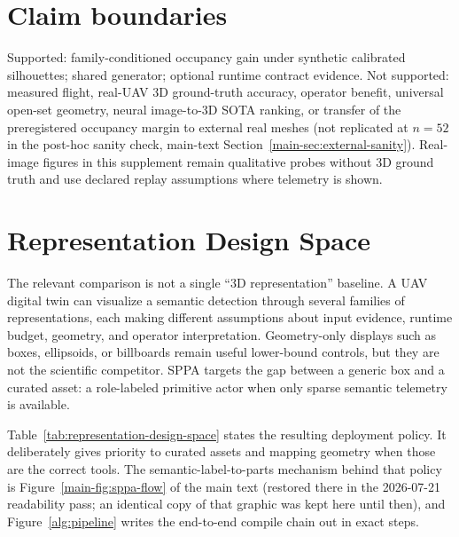 \documentclass[10pt]{article}
\begin{document}
\section*{Claim boundaries}

Supported: family-conditioned occupancy gain under synthetic calibrated
silhouettes; shared generator; optional runtime contract evidence.
Not supported: measured flight, real-UAV 3D ground-truth accuracy, operator
benefit, universal open-set geometry, neural image-to-3D SOTA ranking, or
transfer of the preregistered occupancy margin to external real meshes (not
replicated at \(n{=}52\) in the post-hoc sanity check, main-text
Section~\ref{main-sec:external-sanity}).
Real-image figures in this supplement remain qualitative probes without 3D
ground truth and use declared replay assumptions where telemetry is shown.

\section{Representation Design Space}
\label{sec:supp-design-space}

The relevant comparison is not a single ``3D representation'' baseline. A UAV
digital twin can visualize a semantic detection through several families of
representations, each making different assumptions about input evidence,
runtime budget, geometry, and operator interpretation. Geometry-only displays
such as boxes, ellipsoids, or billboards remain useful lower-bound controls,
but they are not the scientific competitor. SPPA targets the gap between a
generic box and a curated asset: a role-labeled primitive actor when only
sparse semantic telemetry is available.

Table~\ref{tab:representation-design-space} states the resulting deployment
policy. It deliberately gives priority to curated assets and mapping geometry
when those are the correct tools. The semantic-label-to-parts mechanism behind
that policy is Figure~\ref{main-fig:sppa-flow} of the main text (restored
there in the 2026-07-21 readability pass; an identical copy of that graphic
was kept here until then), and Figure~\ref{alg:pipeline} writes the end-to-end
compile chain out in exact steps.
\end{document}
